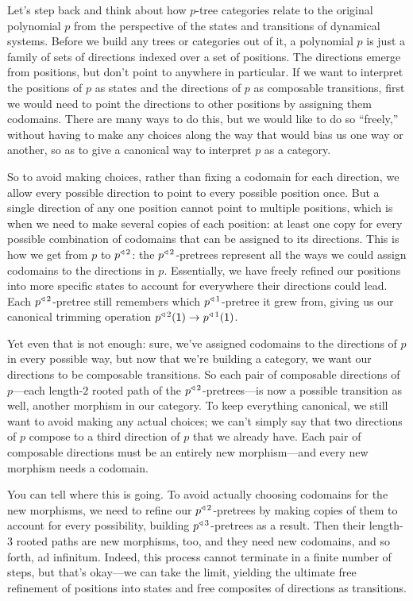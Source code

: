 \documentclass[Book-Poly]{subfiles}
\begin{document}
\begin{example}
Let's step back and think about how $p$-tree categories relate to the original polynomial $p$ from the perspective of the states and transitions of dynamical systems.
Before we build any trees or categories out of it, a polynomial $p$ is just a family of sets of directions indexed over a set of positions.
The directions emerge from positions, but don't point to anywhere in particular.
If we want to interpret the positions of $p$ as states and the directions of $p$ as composable transitions, first we would need to point the directions to other positions by assigning them codomains.
There are many ways to do this, but we would like to do so ``freely,'' without having to make any choices along the way that would bias us one way or another, so as to give a canonical way to interpret $p$ as a category.

So to avoid making choices, rather than fixing a codomain for each direction, we allow every possible direction to point to every possible position once.
But a single direction of any one position cannot point to multiple positions, which is when we need to make several copies of each position: at least one copy for every possible combination of codomains that can be assigned to its directions.
This is how we get from $p$ to $p^{\mathbin{\triangleleft}\,2}$: the $p^{\mathbin{\triangleleft}\,2}$-pretrees represent all the ways we could assign codomains to the directions in $p$.
Essentially, we have freely refined our positions into more specific states to account for everywhere their directions could lead.
Each $p^{\mathbin{\triangleleft}\,2}$-pretree still remembers which $p^{\mathbin{\triangleleft}\,1}$-pretree it grew from, giving us our canonical trimming operation $p^{\mathbin{\triangleleft}\,2}(\textsf{1})\to p^{\mathbin{\triangleleft}\,1}(\textsf{1})$.

Yet even that is not enough: sure, we've assigned codomains to the directions of $p$ in every possible way, but now that we're building a category, we want our directions to be composable transitions.
So each pair of composable directions of $p$—each length-$2$ rooted path of the $p^{\mathbin{\triangleleft}\,2}$-pretrees—is now a possible transition as well, another morphism in our category.
To keep everything canonical, we still want to avoid making any actual choices; we can't simply say that two directions of $p$ compose to a third direction of $p$ that we already have.
Each pair of composable directions must be an entirely new morphism---and every new morphism needs a codomain.

You can tell where this is going.
To avoid actually choosing codomains for the new morphisms, we need to refine our $p^{\mathbin{\triangleleft}\,2}$-pretrees by making copies of them to account for every possibility, building $p^{\mathbin{\triangleleft}\,3}$-pretrees as a result.
Then their length-$3$ rooted paths are new morphisms, too, and they need new codomains, and so forth, ad infinitum.
Indeed, this process cannot terminate in a finite number of steps, but that's okay---we can take the limit, yielding the ultimate free refinement of positions into states and free composites of directions as transitions.


\end{example}
\end{document}
